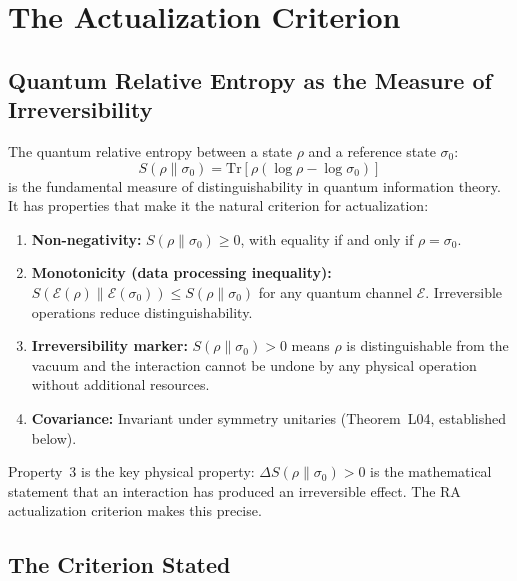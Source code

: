 \documentclass[12pt,a4paper]{article}
\begin{document}
\section{The Actualization Criterion}\label{sec:criterion}

\subsection{Quantum Relative Entropy as the Measure of Irreversibility}

The quantum relative entropy between a state $\rho$ and a reference state $\sigma_0$:
\begin{equation}
  S(\rho\|\sigma_0) = \mathrm{Tr}[\rho(\log\rho - \log\sigma_0)]
  \label{eq:qre}
\end{equation}
is the fundamental measure of distinguishability in quantum information theory.  It has properties that make it the natural criterion for actualization:

\begin{enumerate}
  \item \textbf{Non-negativity:} $S(\rho\|\sigma_0)\geq0$, with equality if and only if $\rho=\sigma_0$.
  \item \textbf{Monotonicity (data processing inequality):} $S(\mathcal{E}(\rho)\|\mathcal{E}(\sigma_0))\leq S(\rho\|\sigma_0)$ for any quantum channel $\mathcal{E}$.  Irreversible operations reduce distinguishability.
  \item \textbf{Irreversibility marker:} $S(\rho\|\sigma_0)>0$ means $\rho$ is distinguishable from the vacuum and the interaction cannot be undone by any physical operation without additional resources.
  \item \textbf{Covariance:} Invariant under symmetry unitaries (Theorem~L04, established below).
\end{enumerate}

Property~3 is the key physical property: $\Delta S(\rho\|\sigma_0)>0$ is the mathematical statement that an interaction has produced an irreversible effect.  The RA actualization criterion makes this precise.

\subsection{The Criterion Stated}
\end{document}
